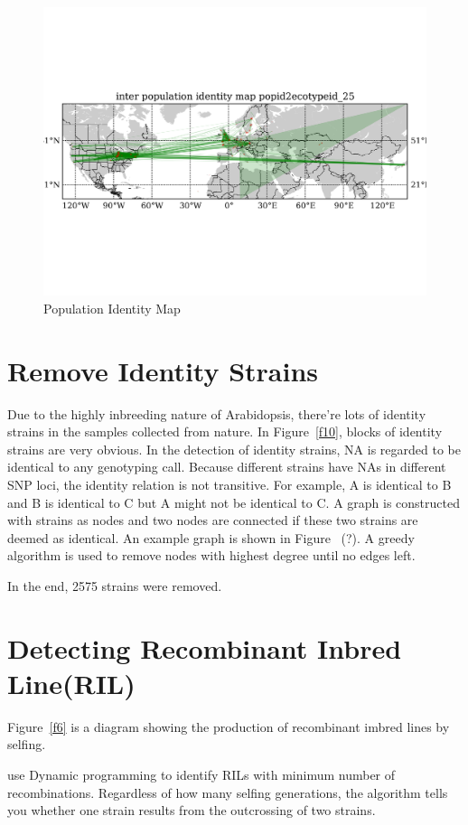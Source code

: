 \documentclass[a4paper,10pt]{article}
\begin{document}
\begin{figure}
\includegraphics[width=1\textwidth]{figures/identity_map1_site_network.png}
\caption{Population Identity Map}\label{f22}
\end{figure}


\section{Remove Identity Strains}
Due to the highly inbreeding nature of Arabidopsis, there're lots of identity strains in the samples collected from nature. In Figure~\ref{f10}, blocks of identity strains are very obvious. In the detection of identity strains, NA is regarded to be identical to any genotyping call. Because different strains have NAs in different SNP loci, the identity relation is not transitive. For example, A is identical to B and B is identical to C but A might not be identical to C. A graph is constructed with strains as nodes and two nodes are connected if these two strains are deemed as identical. An example graph is shown in Figure ~(?). A greedy algorithm is used to remove nodes with highest degree until no edges left.

In the end, 2575 strains were removed.


\section{Detecting Recombinant Inbred Line(RIL)}
Figure~\ref{f6} is a diagram showing the production of recombinant imbred lines by selfing.

use Dynamic programming to identify RILs with minimum number of recombinations. Regardless of how many selfing generations, the algorithm tells you whether one strain results from the outcrossing of two strains.
\end{document}
